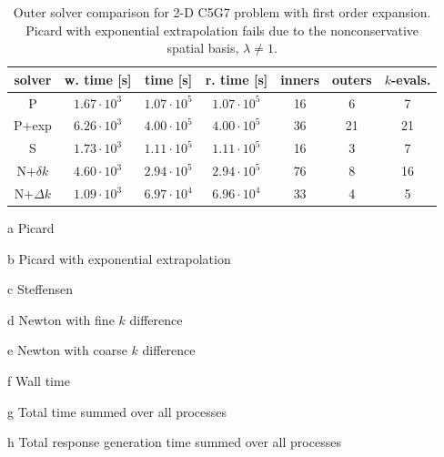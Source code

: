 \begin{table}[ht] 
 \begin{center} 
 
  \begin{threeparttable}
 \begin{tabular}{ccccccc} 
 \toprule 
  solver & w. time\tnote{f} [s] & time\tnote{g} [s] & r. time\tnote{h} [s] & inners & outers & $k$-evals. \\
  \midrule
    P\tnote{a}            &  $1.67\cdot 10^3$ &  $1.07\cdot 10^5$ &  $1.07\cdot 10^5$ &           16 &            6 &            7 \\ 
    P+exp\tnote{b}        &  $6.26\cdot 10^3$ &  $4.00\cdot 10^5$ &  $4.00\cdot 10^5$ &           36 &           21 &           21 \\ 
    S\tnote{c}            &  $1.73\cdot 10^3$ &  $1.11\cdot 10^5$ &  $1.11\cdot 10^5$ &           16 &            3 &            7 \\ 
    N+$\delta k$\tnote{d}            &  $4.60\cdot 10^3$ &  $2.94\cdot 10^5$ &  $2.94\cdot 10^5$ &           76 &            8 &           16 \\ 
    N+$\Delta k$\tnote{e} &  $1.09\cdot 10^3$ &  $6.97\cdot 10^4$ &  $6.96\cdot 10^4$ &           33 &            4 &            5 \\ 
 \bottomrule 
 \end{tabular} 
 
 {\footnotesize
 \begin{tablenotes}
   \item[a] Picard 
   \item[b] Picard with exponential extrapolation
   \item[c] Steffensen
   \item[d] Newton with fine $k$ difference
   \item[e] Newton with coarse $k$ difference
   \item[f] Wall time
   \item[g] Total time summed over all processes
   \item[h] Total response generation time summed over all processes
 \end{tablenotes}
 }
 
 \end{threeparttable}
 
 \end{center} 
 \caption{Outer solver comparison for 2-D C5G7 problem with first order expansion.
          Picard with exponential extrapolation fails due to the nonconservative spatial 
          basis, \ie $\lambda \ne 1$.} 
 \label{tbl:c5g7_outer_study} 
\end{table} 

